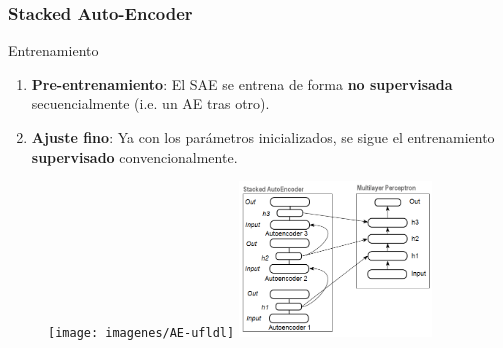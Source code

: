 \begin{frame}[t,fragile]
	\frametitle {Stacked Auto-Encoder}

	
	
	\begin{block}{Entrenamiento}
		
		\begin{enumerate}
			\item \textbf{Pre-entrenamiento}: El SAE se entrena de forma \textbf{no supervisada} secuencialmente (i.e. un AE tras otro).
			
			\item \textbf{Ajuste fino}: Ya con los parámetros inicializados, se sigue el entrenamiento \textbf{supervisado} convencionalmente.
		\end{enumerate}
		
	\end{block}

	\begin{figure}
		\centering
		\texttt{[image: imagenes/AE-ufldl]}
		\qquad
		\includegraphics[width=5.1cm] {imagenes/SAE-mql5} 
	\end{figure}
	
	
\end{frame}
\watermarkon
